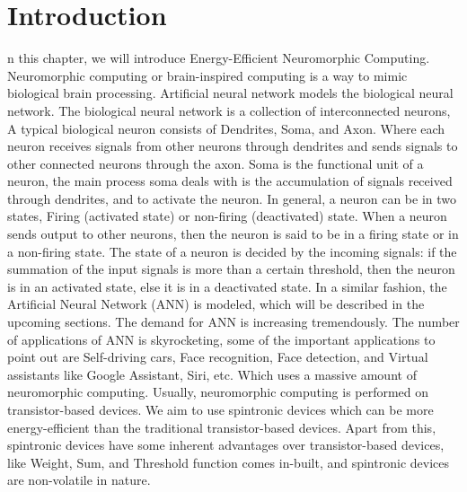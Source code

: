 \chapter{Introduction}
\label{ch:introduction}

n this chapter, we will introduce Energy-Efficient Neuromorphic Computing. Neuromorphic computing or brain-inspired computing is a way to mimic biological brain processing. Artificial neural network models the biological neural network. The biological neural network is a collection of interconnected neurons, A typical biological neuron consists of Dendrites, Soma, and Axon. Where each neuron receives signals from other neurons through dendrites and sends signals to other connected neurons through the axon. Soma is the functional unit of a neuron, the main process soma deals with is the accumulation of signals received through dendrites, and to activate the neuron. In general, a neuron can be in two states, Firing (activated state) or non-firing (deactivated) state. When a neuron sends output to other neurons, then the neuron is said to be in a firing state or in a non-firing state. The state of a neuron is decided by the incoming signals: if the summation of the input signals is more than a certain threshold, then the neuron is in an activated state, else it is in a deactivated state. In a similar fashion, the Artificial Neural Network (ANN) is modeled, which will be described in the upcoming sections. The demand for ANN is increasing tremendously. The number of applications of ANN is skyrocketing, some of the important applications to point out are Self-driving cars, Face recognition, Face detection, and Virtual assistants like Google Assistant, Siri, etc. Which uses a massive amount of neuromorphic computing. Usually, neuromorphic computing is performed on transistor-based devices. We aim to use spintronic devices which can be more energy-efficient than the traditional transistor-based devices. Apart from this, spintronic devices have some inherent advantages over transistor-based devices, like Weight, Sum, and Threshold function comes in-built, and spintronic devices are non-volatile in nature.

